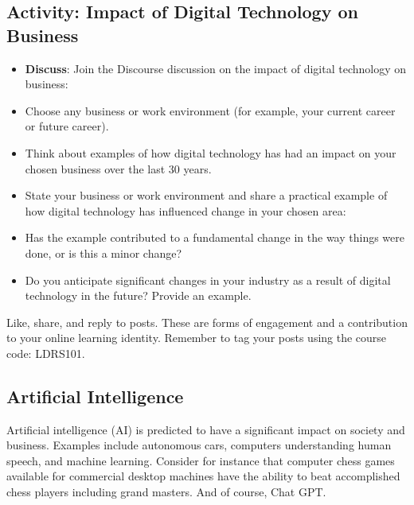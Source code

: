 \documentclass[
  letterpaper,
  DIV=11,
  numbers=noendperiod]{scrreprt}
\providecommand{\tightlist}{%
  \setlength{\itemsep}{0pt}\setlength{\parskip}{0pt}}\usepackage{longtable,booktabs,array}
\begin{document}
\subsection{Activity: Impact of Digital Technology on
Business}\label{activity-impact-of-digital-technology-on-business}

\begin{tcolorbox}[enhanced jigsaw, toprule=.15mm, colback=white, colframe=quarto-callout-note-color-frame, bottomtitle=1mm, leftrule=.75mm, coltitle=black, titlerule=0mm, rightrule=.15mm, colbacktitle=quarto-callout-note-color!10!white, left=2mm, title={Learning Activity}, opacitybacktitle=0.6, opacityback=0, breakable, toptitle=1mm, arc=.35mm, bottomrule=.15mm]

\begin{itemize}
\tightlist
\item
  \textbf{Discuss}: Join the Discourse discussion on the impact of
  digital technology on business:
\item
  Choose any business or work environment (for example, your current
  career or future career).
\item
  Think about examples of how digital technology has had an impact on
  your chosen business over the last 30 years.
\item
  State your business or work environment and share a practical example
  of how digital technology has influenced change in your chosen area:
\item
  Has the example contributed to a fundamental change in the way things
  were done, or is this a minor change?
\item
  Do you anticipate significant changes in your industry as a result of
  digital technology in the future? Provide an example.
\end{itemize}

Like, share, and reply to posts. These are forms of engagement and a
contribution to your online learning identity. Remember to tag your
posts using the course code: LDRS101.

\end{tcolorbox}

\subsection*{Artificial Intelligence}\label{artificial-intelligence}

Artificial intelligence (AI) is predicted to have a significant impact
on society and business. Examples include autonomous cars, computers
understanding human speech, and machine learning. Consider for instance
that computer chess games available for commercial desktop machines have
the ability to beat accomplished chess players including grand masters.
And of course, Chat GPT.
\end{document}
